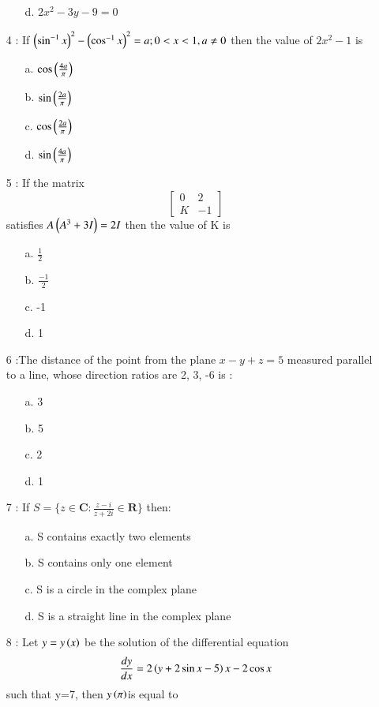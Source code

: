\documentclass[journal]{IEEEtran}
\begin{document}
\begin{enumerate}
\begin{enumerate}
    \item [d.] $2x^2-3y-9=0$
\end{enumerate}
\item[4]: If $\left(\sin ^{-1} x\right)^2-\left(\cos ^{-1} x\right)^2=a; 0<x<1, a\neq 0$ then the value of $2x^2-1$ is
 \begin{enumerate}
    \item [a.] $\cos\left(\frac{4a}{\pi}\right)$
    \item [b.] $\sin\left(\frac{2a}{\pi}\right)$
    \item [c.] $\cos\left(\frac{2a}{\pi}\right)$
    \item [d.] $\sin\left(\frac{4a}{\pi}\right)$
\end{enumerate}
\item[5]: If the matrix $$\begin{bmatrix}
    0&2\\K&-1
\end{bmatrix}$$ satisfies $A\left(A^3+3I\right) = 2I$ then the value of K is
\begin{enumerate}
    \item [a.] $\frac{1}{2}$
    \item [b.] $\frac{-1}{2}$
    \item [c.] -1
    \item [d.] 1
\end{enumerate}
\item[6]:The distance of the point  from the plane $x - y + z = 5$ measured parallel to a line, whose
direction ratios are 2, 3, -6 is :
\begin{enumerate}
\item [a.] 3
    \item [b.] 5
    \item [c.] 2
    \item [d.] 1
\end{enumerate}
\item[7]: If $S = \{z\in\mathbf{C}:\frac{z-i}{z+2i}\in \mathbf{R}\}$ then:
\begin{enumerate}
 \item [a.]  S contains exactly two elements
    \item [b.]  S contains only one element
    \item [c.]  S is a circle in the complex plane
    \item [d.]  S is a straight line in the complex plane
\end{enumerate}
\item[8]: Let $y=y\left(x\right)$ be the solution of the differential equation $$\frac{dy}{dx}=2\left(y+2\sin x-5\right)x-2\cos{x}$$ such that y=7, then $y\left(\pi\right)$is equal to

\end{enumerate}
\end{document}
